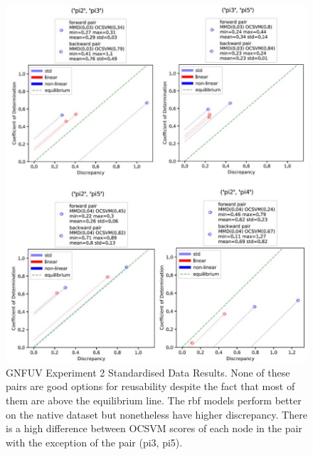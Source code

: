 \documentclass{mpaper}
\begin{document}
\begin{figure}
    \begin{center}
        \includegraphics[scale = 0.5]{experiment_2_std.jpg}
    \end{center}
    \caption{GNFUV Experiment 2 Standardised Data Results. None of these pairs are good options for reusability despite the fact that most of them are above the equilibrium line. The rbf models perform better on the native dataset but nonetheless have higher discrepancy. There is a high difference between OCSVM scores of each node in the pair with the exception of the pair (pi3, pi5).}
    \label{fig:gnfuv_exp2_std}
\end{figure}
\end{document}
